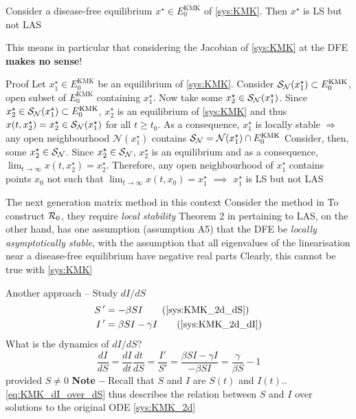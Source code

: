 \documentclass[aspectratio=169]{beamer}\usepackage[]{graphicx}\usepackage[]{xcolor}
\begin{document}
\begin{frame}
\begin{proposition}
Consider a disease-free equilibrium $x^\star\in E_0^\text{KMK}$ of \eqref{sys:KMK}. Then $x^\star$ is LS but not LAS  
\end{proposition}
\vfill
This means in particular that considering the Jacobian of \eqref{sys:KMK} at the DFE \textbf{makes no sense}!
\end{frame}

\begin{frame}{Proof}
Let $x_1^\star\in E_0^\text{KMK}$ be an equilibrium of \eqref{sys:KMK}.
Consider $\S_\mathcal{N}(x_1^\star)\subset E_0^\text{KMK}$, open subset of $E_0^\text{KMK}$ containing $x_1^\star$.
Now take some $x_2^\star\in\S_\mathcal{N}(x_1^\star)$. Since $x_2^\star\in\S_\mathcal{N}(x_1^\star)\subset E_0^\text{KMK}$, $x_2^\star$ is an equilibrium of \eqref{sys:KMK} and thus $x(t,x_2^\star)=x_2^\star\in\S_\mathcal{N}(x_1^\star)$ for all $t\geq t_0$.
As a consequence, $x_1^\star$ is locally stable
\vfill
$\Rightarrow$ any open neighbourhood $\mathcal{N}(x_1^\star)$ contains $\S_\mathcal{N}=\mathcal{N}(x_1^\star)\cap E_0^\text{KMK}$
\vfill
Consider, then, some $x_2^\star\in\S_\mathcal{N}$.
Since $x_2^\star\in\S_\mathcal{N}$, $x_2^\star$ is an equilibrium and as a consequence, $\lim_{t\to\infty}x(t,x_2^\star)=x_2^\star$.
Therefore, any open neighbourhood of $x_1^\star$ contains points $x_0$ not such that $\lim_{t\to\infty}x(t,x_0)=x_1^\star$ $\implies$ $x_1^\star$ is LS but not LAS
\end{frame}

\begin{frame}{The next generation matrix method in this context}
Consider the method in \cite{VdDWatmough2002}
\vfill
To construct $\R_0$, they require \emph{local stability}
\vfill
Theorem 2 in \cite{VdDWatmough2002} pertaining to LAS, on the other hand, has one assumption (assumption A5) that the DFE be \emph{locally asymptotically stable}, with the assumption that all eigenvalues of the linearisation near a disease-free equilibrium have negative real parts
\vfill
Clearly, this cannot be true with \eqref{sys:KMK}
\end{frame}


\begin{frame}{Another approach -- Study $dI/dS$}
  \begin{align}
  S\pprime &= -\beta SI \tag{\ref{sys:KMK_2d_dS}}\\
  I\pprime &= \beta SI-\gamma I  \tag{\ref{sys:KMK_2d_dI}}
  \end{align}
  \vfill
  What is the dynamics of $dI/dS$? 
  \begin{equation}
    \label{eq:KMK_dI_over_dS}
    \frac{dI}{dS}
    =\frac{dI}{dt}\frac{dt}{dS}
    =\frac{I'}{S'}
    =\frac{\beta SI-\gamma I}{-\beta SI}
    =\frac{\gamma}{\beta S}-1
  \end{equation}
 provided $S\neq 0$
  \vfill
  \textbf{Note --} Recall that $S$ and $I$ are $S(t)$ and $I(t)$.. \eqref{eq:KMK_dI_over_dS} thus describes the relation between $S$ and $I$ over solutions to the original ODE \eqref{sys:KMK_2d}
\end{frame}
\end{document}
